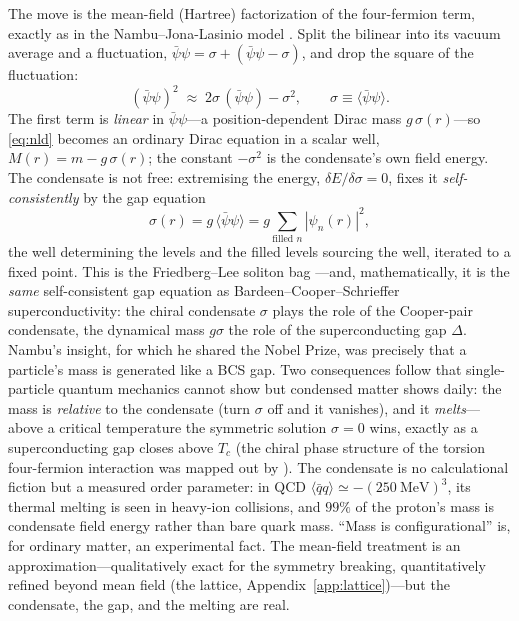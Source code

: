 The move is the mean-field (Hartree) factorization of the four-fermion term, exactly as in the
Nambu--Jona-Lasinio model \citep{nambu1961}. Split the bilinear into its vacuum average and a
fluctuation, $\bar\psi\psi = \sigma + (\bar\psi\psi-\sigma)$, and drop the square of the
fluctuation:
\begin{equation}
  (\bar\psi\psi)^2 \;\approx\; 2\sigma\,(\bar\psi\psi) - \sigma^2,
  \qquad \sigma \equiv \langle\bar\psi\psi\rangle .
  \label{eq:meanfield}
\end{equation}
The first term is \emph{linear} in $\bar\psi\psi$---a position-dependent Dirac mass
$g\,\sigma(r)$---so \eqref{eq:nld} becomes an ordinary Dirac equation in a scalar well,
$M(r)=m-g\,\sigma(r)$; the constant $-\sigma^2$ is the condensate's own field energy. The
condensate is not free: extremising the energy, $\delta E/\delta\sigma=0$, fixes it
\emph{self-consistently} by the gap equation
\begin{equation}
  \sigma(r) = g\,\langle\bar\psi\psi\rangle = g\!\!\sum_{\text{filled }n}\!|\psi_n(r)|^2 ,
  \label{eq:gap}
\end{equation}
the well determining the levels and the filled levels sourcing the well, iterated to a fixed
point. This is the Friedberg--Lee soliton bag \citep{friedberg1977}---and, mathematically, it is
the \emph{same} self-consistent gap equation as Bardeen--Cooper--Schrieffer superconductivity:
the chiral condensate $\sigma$ plays the role of the Cooper-pair condensate, the dynamical mass
$g\sigma$ the role of the superconducting gap $\Delta$. Nambu's insight, for which he shared the
Nobel Prize, was precisely that a particle's mass is generated like a BCS gap. Two consequences
follow that single-particle quantum mechanics cannot show but condensed matter shows daily: the
mass is \emph{relative} to the condensate (turn $\sigma$ off and it vanishes), and it
\emph{melts}---above a critical temperature the symmetric solution $\sigma=0$ wins, exactly as a
superconducting gap closes above $T_c$ (the chiral phase structure of the torsion four-fermion
interaction was mapped out by \citet{xue2008}). The condensate is no calculational fiction but a measured
order parameter: in QCD $\langle\bar q q\rangle\simeq-(250~\mathrm{MeV})^3$, its thermal melting
is seen in heavy-ion collisions, and $99\%$ of the proton's mass is condensate field energy
rather than bare quark mass. ``Mass is configurational'' is, for ordinary matter, an
experimental fact. The mean-field treatment is an approximation---qualitatively exact for the
symmetry breaking, quantitatively refined beyond mean field (the lattice, Appendix~\ref{app:lattice})---but
the condensate, the gap, and the melting are real.

